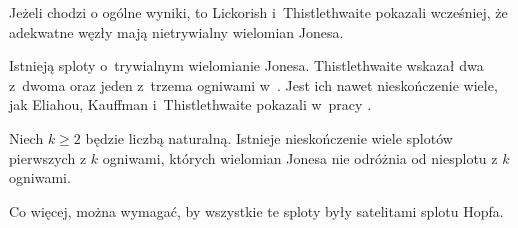 Jeżeli chodzi o ogólne wyniki, to Lickorish i~Thistlethwaite \cite{lickorish88} pokazali wcześniej, że adekwatne węzły mają nietrywialny wielomian Jonesa.
%
%

Istnieją sploty o~trywialnym wielomianie Jonesa.
Thistlethwaite wskazał dwa z~dwoma oraz jeden z~trzema ogniwami w~\cite{thistlethwaite01}.
%
Jest ich nawet nieskończenie wiele, jak Eliahou, Kauffman i~Thistlethwaite pokazali w~pracy \cite{eliahou03}.
%
%


\begin{proposition}
%
%
    Niech $k \ge 2$ będzie liczbą naturalną.
    Istnieje nieskończenie wiele splotów pierwszych z $k$ ogniwami, których wielomian Jonesa nie odróżnia od niesplotu z $k$ ogniwami.

    Co więcej, można wymagać, by wszystkie te sploty były satelitami splotu Hopfa.
\end{proposition}


